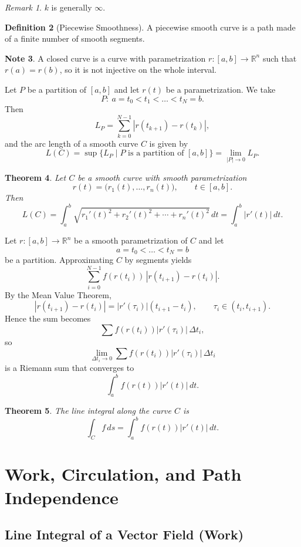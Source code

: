 \documentclass[11pt]{report}
\theoremstyle{definition}
\newtheorem{definition}{Definition}[chapter]
\newtheorem{note}[definition]{Note}
\theoremstyle{plain}
\newtheorem{theorem}[definition]{Theorem}
\theoremstyle{remark}
\newtheorem{remark}[definition]{Remark}
\newcommand{\R}{\mathbb{R}}
\begin{document}
\begin{remark}
$k$ is generally $\infty$.
\end{remark}

\begin{definition}[Piecewise Smoothness]
A piecewise smooth curve is a path made of a finite number of smooth segments.
\end{definition}

\begin{note}
A closed curve is a curve with parametrization $r:[a,b]\to\R^n$ such that $r(a)=r(b)$, so it is not injective on the whole interval.
\end{note}

Let $P$ be a partition of $[a,b]$ and let $r(t)$ be a parametrization. We take
\[
P:\ a=t_0<t_1<\dots<t_N=b.
\]
Then
\[
L_P=\sum_{k=0}^{N-1}|r(t_{k+1})-r(t_k)|,
\]
and the arc length of a smooth curve $C$ is given by
\[
L(C)=\sup\{L_P\mid P \text{ is a partition of } [a,b]\}=\lim_{|P|\to 0}L_P.
\]

\begin{theorem}
Let $C$ be a smooth curve with smooth parametrization
\[
r(t)=\bigl(r_1(t),\dots,r_n(t)\bigr),\qquad t\in[a,b].
\]
Then
\[
L(C)=\int_a^b \sqrt{r_1'(t)^2+r_2'(t)^2+\cdots+r_n'(t)^2}\,dt
=\int_a^b |r'(t)|\,dt.
\]
\end{theorem}

Let $r:[a,b]\to \R^n$ be a smooth parametrization of $C$ and let
\[
a=t_0<\dots<t_N=b
\]
be a partition. Approximating $C$ by segments yields
\[
\sum_{i=0}^{N-1} f(r(t_i))\,|r(t_{i+1})-r(t_i)|.
\]
By the Mean Value Theorem,
\[
|r(t_{i+1})-r(t_i)|=|r'(\tau_i)|(t_{i+1}-t_i),
\qquad \tau_i\in(t_i,t_{i+1}).
\]
Hence the sum becomes
\[
\sum f(r(t_i))|r'(\tau_i)|\,\Delta t_i,
\]
so
\[
\lim_{\Delta t_i\to 0}\sum f(r(t_i))|r'(\tau_i)|\,\Delta t_i
\]
is a Riemann sum that converges to
\[
\int_a^b f(r(t))|r'(t)|\,dt.
\]

\begin{theorem}
The line integral along the curve $C$ is
\[
\int_C f\,ds
=\int_a^b f(r(t))|r'(t)|\,dt.
\]
\end{theorem}

\section{Work, Circulation, and Path Independence}

\subsection{Line Integral of a Vector Field (Work)}
\end{document}
